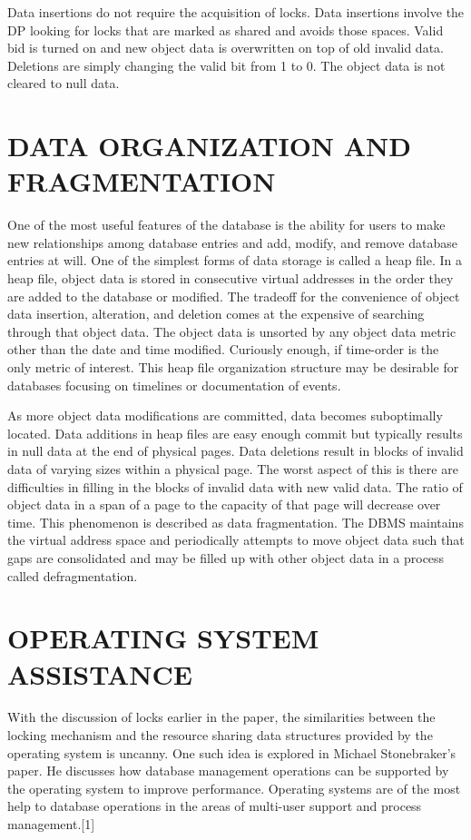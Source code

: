 \documentclass[letterpaper, 10 pt, conference]{ieeeconf}
\begin{document}
Data insertions do not require the acquisition of locks.  Data insertions involve the DP looking for locks that are marked as shared and avoids those spaces.  Valid bid is turned on and new object data is overwritten on top of old invalid data.  Deletions are simply changing the valid bit from 1 to 0.  The object data is not cleared to null data.

\section{DATA ORGANIZATION AND FRAGMENTATION}
One of the most useful features of the database is the ability for users to make new relationships among database entries and add, modify, and remove database entries at will.  One of the simplest forms of data storage is called a heap file.  In a heap file, object data is stored in consecutive virtual addresses in the order they are added to the database or modified.  The tradeoff for the convenience of object data insertion, alteration, and deletion comes at the expensive of searching through that object data.  The object data is unsorted by any object data metric other than the date and time modified.  Curiously enough, if time-order is the only metric of interest.  This heap file organization structure may be desirable for databases focusing on timelines or documentation of events.

As more object data modifications are committed, data becomes suboptimally located.  Data additions in heap files are easy enough commit but typically results in null data at the end of physical pages.  Data deletions result in blocks of invalid data of varying sizes within a physical page.  The worst aspect of this is there are difficulties in filling in the blocks of invalid data with new valid data.  The ratio of object data in a span of a page to the capacity of that page will decrease over time.  This phenomenon is described as data fragmentation.  The DBMS maintains the virtual address space and periodically attempts to move object data such that gaps are consolidated and may be filled up with other object data in a process called defragmentation.  


\section{OPERATING SYSTEM ASSISTANCE}
With the discussion of locks earlier in the paper, the similarities between the locking mechanism and the resource sharing data structures provided by the operating system is uncanny.  One such idea is explored in Michael Stonebraker’s paper.  He discusses how database management operations can be supported by the operating system to improve performance.  Operating systems are of the most help to database operations in the areas of multi-user support and process management.[1]
\end{document}
